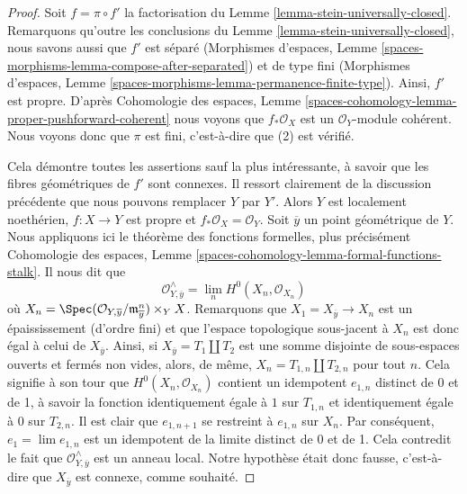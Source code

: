 \begin{proof}
Soit $f = \pi \circ f'$ la factorisation du
Lemme \ref{lemma-stein-universally-closed}. Remarquons qu'outre les
conclusions du Lemme \ref{lemma-stein-universally-closed}, nous
savons aussi que $f'$ est séparé
(Morphismes d'espaces, Lemme
\ref{spaces-morphisms-lemma-compose-after-separated})
et de type fini
(Morphismes d'espaces, Lemme
\ref{spaces-morphisms-lemma-permanence-finite-type}).
Ainsi, $f'$ est propre. D'après
Cohomologie des espaces, Lemme
\ref{spaces-cohomology-lemma-proper-pushforward-coherent}
nous voyons que $f_*\mathcal{O}_X$ est un $\mathcal{O}_Y$-module cohérent.
Nous voyons donc que $\pi$ est fini, c'est-à-dire que (2) est vérifié.

\medskip\noindent
Cela démontre toutes les assertions sauf la plus intéressante, à savoir que
les fibres géométriques de $f'$ sont connexes. Il ressort clairement de la
discussion précédente que nous pouvons remplacer $Y$ par $Y'$.
Alors $Y$ est localement noethérien,
$f : X \to Y$ est propre et $f_*\mathcal{O}_X = \mathcal{O}_Y$.
Soit $\overline{y}$ un point géométrique de $Y$.
Nous appliquons ici le théorème des fonctions formelles,
plus précisément Cohomologie des espaces, Lemme
\ref{spaces-cohomology-lemma-formal-functions-stalk}.
Il nous dit que
$$
\mathcal{O}^\wedge_{Y, \overline{y}} =
\lim_n H^0(X_n, \mathcal{O}_{X_n})
$$
où $X_n =
\Spec(\mathcal{O}_{Y, \overline{y}}/\mathfrak m_{\overline{y}}^n) \times_Y X$.
Remarquons que $X_1 = X_{\overline{y}} \to X_n$ est un épaississement (d'ordre fini)
et que l'espace topologique sous-jacent à $X_n$ est donc égal à celui
de $X_{\overline{y}}$. Ainsi, si $X_{\overline{y}} = T_1 \amalg T_2$
est une somme disjointe de sous-espaces ouverts et fermés non vides, alors, de même,
$X_n = T_{1, n} \amalg T_{2, n}$ pour tout $n$. Cela signifie à son tour que
$H^0(X_n, \mathcal{O}_{X_n})$ contient un idempotent $e_{1, n}$ distinct de 0 et de 1,
à savoir la fonction identiquement égale à $1$ sur $T_{1, n}$ et
identiquement égale à $0$ sur $T_{2, n}$. Il est clair que $e_{1, n + 1}$
se restreint à $e_{1, n}$ sur $X_n$. Par conséquent, $e_1 = \lim e_{1, n}$
est un idempotent de la limite distinct de 0 et de 1. Cela contredit le fait
que $\mathcal{O}^\wedge_{Y, \overline{y}}$ est un anneau local. Notre
hypothèse était donc fausse, c'est-à-dire que $X_{\overline{y}}$ est connexe,
comme souhaité.
\end{proof}

